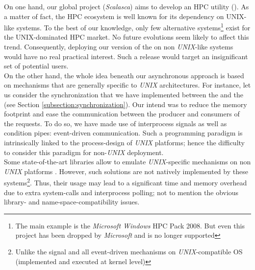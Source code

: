 		On one hand, our global project (\emph{Scalasca}) aims to develop an HPC utility (\toolTargetSoftware).   As a matter of fact, the HPC ecosystem is well known for its dependency on UNIX-like systems.   To the best of our knowledge, only few alternative systems\footnote{The main example is the \emph{Microsoft Windows} HPC Pack 2008.   But even this project has been dropped by \emph{Microsoft} and is no longer supported} exist for the UNIX-dominated HPC market.   No future evolutions seem likely to affect this trend.   Consequently, deploying our version of the \toolTargetSoftware\space on non \emph{UNIX}-like systems would have no real practical interest.   Such a release would target an insignificant set of potential users.\\

		On the other hand, the whole idea beneath our asynchronous approach is based on mechanisms that are generally specific to \emph{UNIX} architectures.   For instance, let us consider the synchronization that we have implemented between the \notationaioComputeThread\space and the \notationaioWriteThreads\space (see Section \ref{subsection:synchronization}).   Our intend was to reduce the memory footprint and ease the communication between the producer and consumers of the \notationIO\space requests.   To do so, we have made use of interprocess signals as well as condition pipes: event-driven communication.   Such a programming paradigm is intrinsically linked to the process-design of \emph{UNIX} platforms;   hence the difficulty to consider this paradigm for non-\emph{UNIX} deployment.\\
		Some state-of-the-art libraries allow to emulate \emph{UNIX}-specific mechanisms on non \emph{UNIX} platforms \cite{robison2012cilk}.   However, such solutions are not natively implemented by these systems\footnote{Unlike the signal and all event-driven mechanisms on \emph{UNIX}-compatible OS (implemented and executed at kernel level)}.   Thus, their usage may lead to a significant time and memory overhead due to extra system-calls and interprocess polling;  not to mention the obvious library- and name-space-compatibility issues.\\


